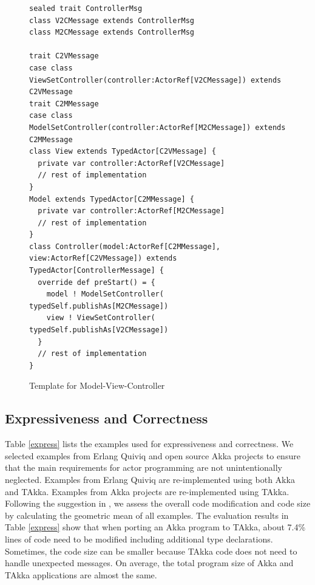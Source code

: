 \begin{figure}[h]
\label{MVC}
\begin{lstlisting}
sealed trait ControllerMsg
class V2CMessage extends ControllerMsg
class M2CMessage extends ControllerMsg

trait C2VMessage
case class ViewSetController(controller:ActorRef[V2CMessage]) extends 
C2VMessage
trait C2MMessage
case class ModelSetController(controller:ActorRef[M2CMessage]) extends 
C2MMessage
class View extends TypedActor[C2VMessage] {
  private var controller:ActorRef[V2CMessage]
  // rest of implementation
}
Model extends TypedActor[C2MMessage] {
  private var controller:ActorRef[M2CMessage]
  // rest of implementation
}
class Controller(model:ActorRef[C2MMessage], view:ActorRef[C2VMessage]) extends 
TypedActor[ControllerMessage] {
  override def preStart() = {
    model ! ModelSetController( typedSelf.publishAs[M2CMessage])
    view ! ViewSetController( typedSelf.publishAs[V2CMessage])
  }
  // rest of implementation
}
\end{lstlisting}
\caption{Template for Model-View-Controller}
\end{figure}



\subsection{Expressiveness and Correctness}
\label{expressiveness}
Table \ref{express} lists the examples used for expressiveness and 
correctness.  We selected examples from Erlang Quiviq \citep{quviq}
and open source Akka projects to ensure that the main requirements for actor 
programming are not unintentionally neglected.  Examples from Erlang 
Quiviq are re-implemented using both Akka and TAkka.  Examples from 
Akka projects are re-implemented using TAkka.  Following the suggestion in  
\citep{HePa06}, we assess the overall code modification and code 
size by calculating the geometric mean of all examples. The evaluation results 
in Table \ref{express} show that when porting an Akka program to TAkka, about 
7.4\% lines of code need to be modified including additional type declarations. 
Sometimes, the code size can be smaller because TAkka code does not 
need to handle unexpected messages.  On average, the total program size 
of Akka and TAkka applications are almost the same.

